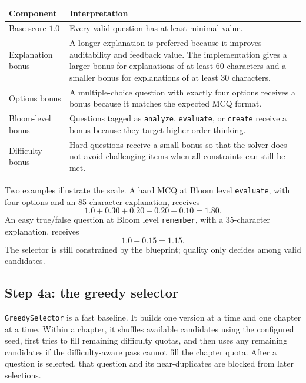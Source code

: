 \documentclass[11pt,a4paper]{article}
\newcommand{\code}[1]{\texttt{\small #1}}
\begin{document}
\begin{center}
\begin{tabular}{@{}p{4.0cm}p{8.5cm}@{}}
\toprule
\textbf{Component} & \textbf{Interpretation} \\
\midrule
Base score $1.0$ & Every valid question has at least minimal value. \\
Explanation bonus & A longer explanation is preferred because it improves auditability and feedback value. The implementation gives a larger bonus for explanations of at least 60 characters and a smaller bonus for explanations of at least 30 characters. \\
Options bonus & A multiple-choice question with exactly four options receives a bonus because it matches the expected MCQ format. \\
Bloom-level bonus & Questions tagged as \code{analyze}, \code{evaluate}, or \code{create} receive a bonus because they target higher-order thinking. \\
Difficulty bonus & Hard questions receive a small bonus so that the solver does not avoid challenging items when all constraints can still be met. \\
\bottomrule
\end{tabular}
\end{center}

Two examples illustrate the scale. A hard MCQ at Bloom level \code{evaluate},
with four options and an 85-character explanation, receives
\begin{equation}
  1.0 + 0.30 + 0.20 + 0.20 + 0.10 = 1.80.
\end{equation}
An easy true/false question at Bloom level \code{remember}, with a 35-character
explanation, receives
\begin{equation}
  1.0 + 0.15 = 1.15.
\end{equation}
The selector is still constrained by the blueprint; quality only decides among
valid candidates.

\subsection{Step 4a: the greedy selector}

\code{GreedySelector} is a fast baseline. It builds one version at a time and
one chapter at a time. Within a chapter, it shuffles available candidates using
the configured seed, first tries to fill remaining difficulty quotas, and then
uses any remaining candidates if the difficulty-aware pass cannot fill the
chapter quota. After a question is selected, that question and its
near-duplicates are blocked from later selections.
\end{document}
